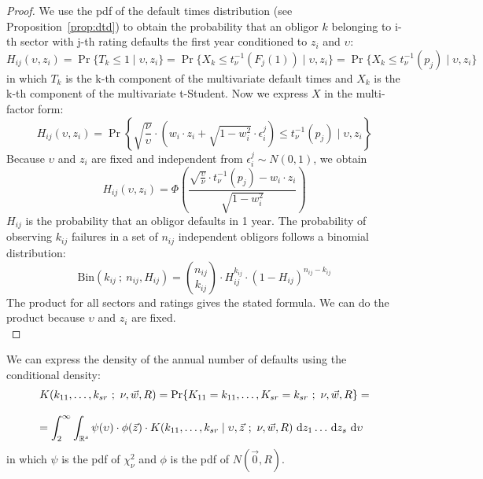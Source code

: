 \documentclass[11pt,fleqn]{book} %
\begin{document}
\begin{proof}
	We use the pdf of the default times distribution (see 
	Proposition~\ref{prop:dtd}) to obtain the probability that an obligor 
	$k$ belonging to i-th sector with j-th rating defaults the first year 
	conditioned to $z_i$ and $\upsilon$:
	\begin{displaymath}
		H_{ij}(\upsilon,z_i) = 
		\Pr\{T_k \le 1 \mid \upsilon, z_i\} = 
		\Pr\{ X_k \le t_{\nu}^{-1}(F_j(1)) \mid \upsilon, z_i\} = 
		\Pr\{ X_k \le t_{\nu}^{-1}(p_j) \mid \upsilon, z_i\}
	\end{displaymath}
	in which $T_k$ is the k-th component of the multivariate default times 
	and $X_k$ is the k-th component of the multivariate t-Student. 
	Now we express $X$ in the multi-factor form:
	\begin{displaymath}
		H_{ij}(\upsilon,z_i) = \Pr \left\{ 
		\sqrt{\frac{\nu}{\upsilon}} \cdot \left( w_i \cdot z_i + \sqrt{1-w_i^2} \cdot \epsilon_i^j\right)
		\le t_{\nu}^{-1}(p_j) \mid \upsilon, z_i
		\right\}
	\end{displaymath}
	Because $\upsilon$ and $z_i$ are fixed and independent from 
	$\epsilon_i^j \sim N(0,1)$, we obtain
	\begin{displaymath}
		H_{ij}(\upsilon,z_i) = \Phi\left(  
		\frac{\sqrt{\frac{\upsilon}{\nu}} \cdot t_{\nu}^{-1}(p_j) - w_i\cdot z_i}{\sqrt{1-w_i^2}}
		\right)
	\end{displaymath}
	$H_{ij}$ is the probability that an obligor defaults in 1 year. The 
	probability of observing $k_{ij}$ failures in a set of $n_{ij}$ independent
	obligors follows a binomial distribution:
	\begin{displaymath}
		\text{Bin}(k_{ij}\ ;\ n_{ij},H_{ij}) = 
		\binom{n_{ij}}{k_{ij}} \cdot H_{ij}^{k_{ij}} \cdot (1-H_{ij})^{n_{ij}-k_{ij}}
	\end{displaymath}
	The product for all sectors and ratings gives the stated formula. 
	We can do the product because $\upsilon$ and $z_i$ are fixed.
	\\
\end{proof}

\begin{corollary}
	We can express the density of the annual number of defaults using 
	the conditional density:
	\begin{displaymath}
		\begin{array}{l}
			K(k_{11},\dots,k_{sr}\ ;\ \nu, \vec{w}, R) = 
			\Pr\{K_{11}=k_{11},\dots,K_{sr}=k_{sr}\ ;\ \nu, \vec{w}, R\} = \\
			\\
			= \displaystyle \int_2^{\infty} \int_{\mathbb{R}^s}
			\psi(\upsilon) \cdot \phi(\vec{z}) \cdot
			K(k_{11},\dots,k_{sr} \mid \upsilon,\vec{z}\ ;\ \nu,\vec{w}, R) 
			\mathop{\,\mathrm{{}d}}\mathopen{} z_1 \dots \mathop{\,\mathrm{{}d}}\mathopen{} z_s \mathop{\,\mathrm{{}d}}\mathopen{} \upsilon
		\end{array}
	\end{displaymath}
	in which $\psi$ is the pdf of $\chi_{\nu}^2$ and $\phi$ is the pdf 
	of $N(\vec{0},R)$.
\end{corollary}
\end{document}
